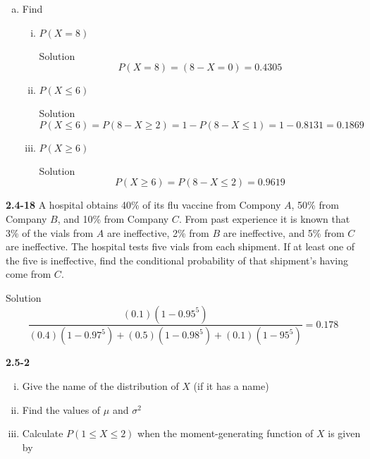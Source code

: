 \documentclass{article}
\begin{document}
\begin{spacing}{1.1}
\begin{homeworkProblem}
\begin{enumerate}[(a)]
			\begin{homeworkSection}{Solution}
				\[ X = b(8, 0.90) \]
			\end{homeworkSection}
		\item Find
			\begin{enumerate}[(i)]
				\item $P(X = 8)$
					\begin{homeworkSection}{Solution}
						\[P(X = 8) = (8 -X = 0) = 0.4305\]
					\end{homeworkSection}
				\item $P(X \le 6)$
					\begin{homeworkSection}{Solution}
						\[ P(X \le 6) = P(8 - X \ge 2) = 1 - P(8 - X \le 1) = 1 - 0.8131 = 0.1869 \]
					\end{homeworkSection}
				\item $P(X \ge 6)$
					\begin{homeworkSection}{Solution}
						\[ P(X \ge 6) = P(8 - X \le 2) = 0.9619 \]
					\end{homeworkSection}
			\end{enumerate}
	\end{enumerate}
\end{homeworkProblem}
\begin{homeworkProblem}
	{\bf 2.4-18} A hospital obtains 40\% of its flu vaccine from Compony $A$, 50\% from Company $B$, and 10\% from Company $C$.  From past experience it is known that 3\% of the vials from $A$ are ineffective, 2\% from $B$ are ineffective, and 5\% from $C$ are ineffective.  The hospital tests five vials from each shipment.  If at least one of the five is ineffective, find the conditional probability of that shipment's having come from $C$.  
	\begin{homeworkSection}{Solution}
	\[\frac{{\left( {0.1} \right)\left( {1 - {{0.95}^5}} \right)}}{{\left( {0.4} \right)\left( {1 - {{0.97}^5}} \right) + \left( {0.5} \right)\left( {1 - {{0.98}^5}} \right) + \left( {0.1} \right)\left( {1 - {{95}^5}} \right)}} = 0.178\]
	\end{homeworkSection}
\end{homeworkProblem}
\begin{homeworkProblem}
	{\bf  2.5-2}	 
	\begin{enumerate}[(i)]
		\item Give the name of the distribution of $X$ (if it has a name)
		\item Find the values of $\mu$ and $\sigma^2$
		\item Calculate $P( 1 \le X \le 2)$ when the moment-generating function of $X$ is given by
	\end{enumerate}
	

\end{homeworkProblem}
\end{spacing}
\end{document}

